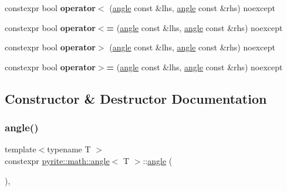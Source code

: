 \begin{DoxyCompactItemize}
\item 
\mbox{\label{classpyrite_1_1math_1_1angle_ad7c85186c2bebde44aacc2a5df292a9d}} 
constexpr bool {\bfseries operator$<$} (\mbox{\hyperlink{classpyrite_1_1math_1_1angle}{angle}} const \&lhs, \mbox{\hyperlink{classpyrite_1_1math_1_1angle}{angle}} const \&rhs) noexcept
\item 
\mbox{\label{classpyrite_1_1math_1_1angle_a50372b5d3853f13f11293ca14721cc84}} 
constexpr bool {\bfseries operator$<$=} (\mbox{\hyperlink{classpyrite_1_1math_1_1angle}{angle}} const \&lhs, \mbox{\hyperlink{classpyrite_1_1math_1_1angle}{angle}} const \&rhs) noexcept
\item 
\mbox{\label{classpyrite_1_1math_1_1angle_a30ca63b1b25a49492042530ee60ed4ef}} 
constexpr bool {\bfseries operator$>$} (\mbox{\hyperlink{classpyrite_1_1math_1_1angle}{angle}} const \&lhs, \mbox{\hyperlink{classpyrite_1_1math_1_1angle}{angle}} const \&rhs) noexcept
\item 
\mbox{\label{classpyrite_1_1math_1_1angle_ac7bef78cbae62dbe5b8a16e61a3101de}} 
constexpr bool {\bfseries operator$>$=} (\mbox{\hyperlink{classpyrite_1_1math_1_1angle}{angle}} const \&lhs, \mbox{\hyperlink{classpyrite_1_1math_1_1angle}{angle}} const \&rhs) noexcept
\end{DoxyCompactItemize}


\subsection{Constructor \& Destructor Documentation}
\mbox{\label{classpyrite_1_1math_1_1angle_a391868de4c78d823cf4a55373e28b90c}} 
\subsubsection{\texorpdfstring{angle()}{angle()}\hspace{0.1cm}{\footnotesize\ttfamily [1/5]}}
{\footnotesize\ttfamily template$<$typename T $>$ \\
constexpr \mbox{\hyperlink{classpyrite_1_1math_1_1angle}{pyrite\+::math\+::angle}}$<$ T $>$\+::\mbox{\hyperlink{classpyrite_1_1math_1_1angle}{angle}} (\begin{DoxyParamCaption}{ }\end{DoxyParamCaption})\hspace{0.3cm}{\ttfamily [default]}, {\ttfamily [noexcept]}}

